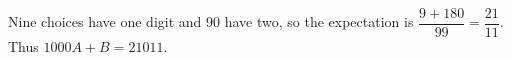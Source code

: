 Nine choices have one digit and 90 have two, so the expectation is $\dfrac{9+180}{99}=\dfrac{21}{11}$. Thus $\boxed{1000A+B=21011}$.
